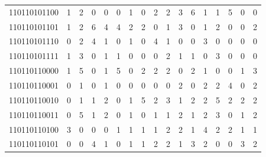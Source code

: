 \documentclass[10pt,a4paper]{article}
\begin{document}
\begin{longtable}{ |c|c|c|c|c|c|c|c|c|c|c|c|c|c|c|c|c| }
    110110101100              & 1                            & 2                                & 0                            & 0                              & 0   & 1   & 0   & 2   & 2   & 3   & 6   & 1   & 1   & 5   & 0   & 0   \\
    110110101101              & 1                            & 2                                & 6                            & 4                              & 4   & 2   & 2   & 0   & 1   & 3   & 0   & 1   & 2   & 0   & 0   & 2   \\
    110110101110              & 0                            & 2                                & 4                            & 1                              & 0   & 1   & 0   & 4   & 1   & 0   & 0   & 3   & 0   & 0   & 0   & 0   \\
    110110101111              & 1                            & 3                                & 0                            & 1                              & 1   & 0   & 0   & 0   & 2   & 1   & 1   & 0   & 3   & 0   & 0   & 0   \\
    110110110000              & 1                            & 5                                & 0                            & 1                              & 5   & 0   & 2   & 2   & 2   & 0   & 2   & 1   & 0   & 0   & 1   & 3   \\
    110110110001              & 0                            & 1                                & 0                            & 1                              & 0   & 0   & 0   & 0   & 0   & 2   & 0   & 2   & 2   & 4   & 0   & 2   \\
    110110110010              & 0                            & 1                                & 1                            & 2                              & 0   & 1   & 5   & 2   & 3   & 1   & 2   & 2   & 5   & 2   & 2   & 2   \\
    110110110011              & 0                            & 5                                & 1                            & 2                              & 0   & 1   & 0   & 1   & 1   & 2   & 1   & 2   & 3   & 0   & 1   & 2   \\
    110110110100              & 3                            & 0                                & 0                            & 0                              & 1   & 1   & 1   & 1   & 2   & 2   & 1   & 4   & 2   & 2   & 1   & 1   \\
    110110110101              & 0                            & 0                                & 4                            & 1                              & 0   & 1   & 1   & 2   & 2   & 1   & 3   & 2   & 0   & 0   & 3   & 2   \\

\end{longtable}
\end{document}

